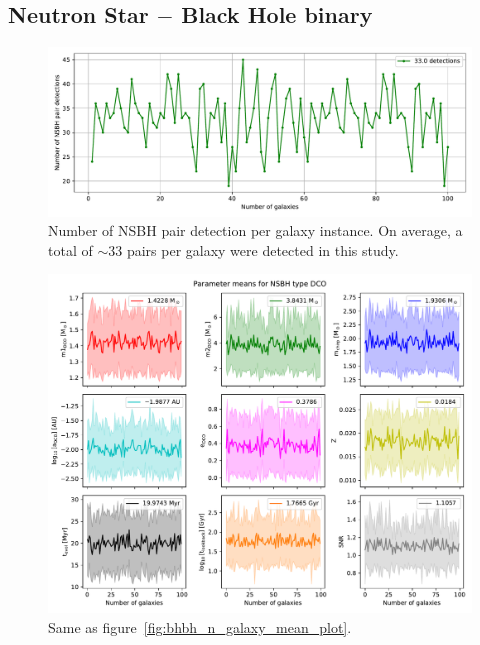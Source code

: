 \subsection{Neutron Star $-$ Black Hole binary}
\begin{figure}[h]
	\centering
	\includegraphics[width=\columnwidth]{analysis_data/004__images_for_latex/NSBH_n_detections}
	\caption{Number of NSBH pair detection per galaxy instance. On average, a total of $\sim$33 pairs per galaxy were detected in this study.}
	\label{fig:nsbhndetections}
\end{figure}	

\begin{figure}[h]
	\centering
	\includegraphics[width=\columnwidth]{analysis_data/004__images_for_latex/NSBH_n_galaxy_mean_plot}
	\caption{Same as figure~\ref{fig:bhbh_n_galaxy_mean_plot}.}
	\label{fig:nsbh_n_galaxy_mean_plot}
\end{figure}
